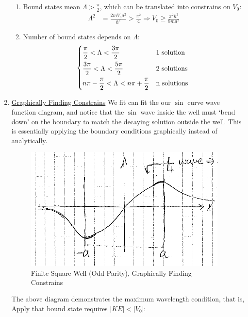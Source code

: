 \documentclass{school-22.101-notes}
\begin{document}
\begin{enumerate}
\begin{enumerate}
    \item Bound states mean $\Lambda > \frac{\pi}{2}$, which can be translated into constrains on $V_0$:
    \begin{align}
    \Lambda^2 &= \frac{2m V_0 a^2}{\hbar^2} > \frac{\pi^2}{4} \Rightarrow V_0 \ge \frac{\pi^2 \hbar^2}{8 m a^2} 
    \end{align}
    
    \item Number of bound states depends on $\Lambda$:
    \begin{align}
        \begin{dcases*}
         \frac{\pi}{2} < \Lambda < \frac{3\pi}{2}   & 1 solution \\
         \frac{3\pi}{2} < \Lambda < \frac{5 \pi}{2} & 2 solutions \\
         n \pi  - \frac{\pi}{2} < \Lambda < n \pi  + \frac{\pi}{2} & n solutions
        \end{dcases*}
    \end{align}
\end{enumerate}


\item \uline{Graphically Finding Constrains}
We fit can fit the our $\sin$ curve wave function diagram, and notice that the $\sin$ wave inside the well must `bend down' on the boundary to match the decaying solution outside the well. This is essentially applying the boundary conditions graphically instead of analytically.
\begin{figure}[h!]
    \centering
    \includegraphics[width=4in]{images/qm/FSW-odd-graph-psi.png}
    \caption{Finite Square Well (Odd Parity), Graphically Finding Constrains}
\end{figure}
The above diagram demonstrates the maximum wavelength condition, that is, 
Apply that bound state requires $|KE| <|V_0|$: 
\end{enumerate}
\end{document}

